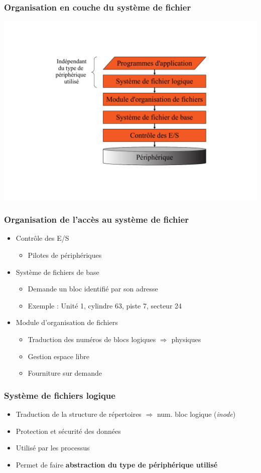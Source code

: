 \begin{frame}
\frametitle{Organisation en couche du système de fichier}
\includegraphics[height=.9\textheight]{../illustration/couches_systeme_fichier.pdf}
\end{frame}

\begin{frame}
\frametitle{Organisation de l'accès au système de fichier}
\begin{itemize}
\item Contrôle des E/S
\begin{itemize}
\item Pilotes de périphériques
\end{itemize}
\item Système de fichiers de base
\begin{itemize}
\item Demande un bloc identifié par son adresse
\item Exemple : Unité 1, cylindre 63, piste 7, secteur 24
\end{itemize}
\item Module d'organisation de fichiers
\begin{itemize}
\item Traduction des numéros de blocs logiques $\Longrightarrow$ physiques
\item Gestion espace libre
\item Fourniture sur demande
\end{itemize}
\end{itemize}
\end{frame}

\begin{frame}
\frametitle{Système de fichiers logique}
\begin{itemize}
\item Traduction de la structure de répertoires $\Longrightarrow$ num. bloc logique (\textit{inode})
\item Protection et sécurité des données
\item Utilisé par les processus

\item Permet de faire \textbf{abstraction du type de périphérique utilisé }
\end{itemize}
\end{frame}

